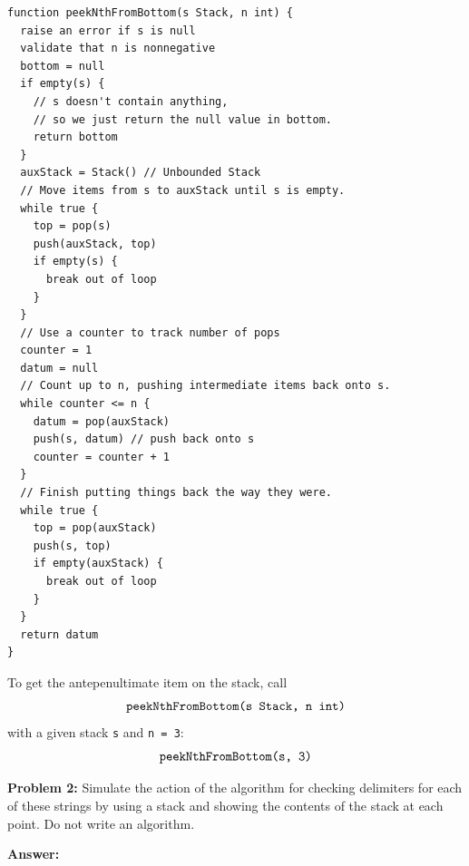 \documentclass[12pt,letterpaper,final]{report}
\begin{document}
\pagebreak
\begin{mdframed}
  \begin{verbatim}
function peekNthFromBottom(s Stack, n int) {
  raise an error if s is null
  validate that n is nonnegative
  bottom = null
  if empty(s) {
    // s doesn't contain anything,
    // so we just return the null value in bottom.
    return bottom
  }
  auxStack = Stack() // Unbounded Stack
  // Move items from s to auxStack until s is empty.
  while true {
    top = pop(s)
    push(auxStack, top)
    if empty(s) {
      break out of loop
    }
  }
  // Use a counter to track number of pops
  counter = 1
  datum = null
  // Count up to n, pushing intermediate items back onto s.
  while counter <= n {
    datum = pop(auxStack)
    push(s, datum) // push back onto s
    counter = counter + 1
  }
  // Finish putting things back the way they were.
  while true {
    top = pop(auxStack)
    push(s, top)
    if empty(auxStack) {
      break out of loop
    }
  }
  return datum
}
\end{verbatim}
\end{mdframed}

To get the antepenultimate item on the stack, call
\[
  \verb|peekNthFromBottom(s Stack, n int)|
\]
with a given stack \verb|s| and \verb|n = 3|:
\[
  \verb|peekNthFromBottom(s, 3)|
\]

\pagebreak
\noindent\textbf{Problem 2:}
Simulate the action of the algorithm for checking delimiters for each of these strings by using a stack and showing the contents of the stack at each point. Do not write an algorithm.

\noindent\textbf{Answer:}
\end{document}
